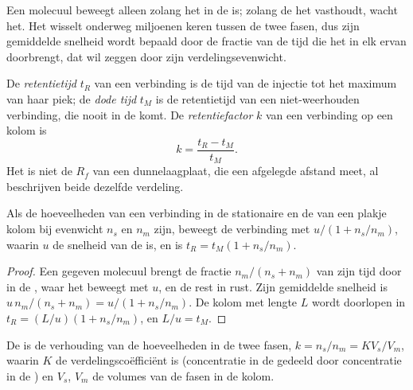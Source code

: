 Een molecuul beweegt alleen zolang het in de  is; zolang de  het vasthoudt,
wacht het. Het wisselt onderweg miljoenen keren tussen de twee fasen, dus zijn gemiddelde snelheid wordt bepaald door
de fractie van de tijd die het in elk ervan doorbrengt, dat wil zeggen door zijn verdelingsevenwicht.

\begin{definition}[Retentie]\label{def:b2:chromatography:retention}
De \emph{retentietijd} $t_R$ van een verbinding is de tijd van de injectie tot het
maximum van haar piek; de \emph{dode tijd} $t_M$ is de retentietijd van een
niet-weerhouden verbinding, die nooit in de  komt. De \emph{retentiefactor}
$k$ van een verbinding op een kolom is
\begin{equation*}
k = \frac{t_R - t_M}{t_M}.
\end{equation*}
Het is niet de $R_f$ van een dunnelaagplaat, die een afgelegde afstand meet, al beschrijven beide
dezelfde verdeling.
\end{definition}

\begin{proposition}[Retentietijd]\label{prop:b2:chromatography:retention-time}
Als de hoeveelheden van een verbinding in de stationaire en de  van een plakje kolom bij evenwicht
$n_s$ en $n_m$ zijn, beweegt de verbinding met $u/(1 + n_s/n_m)$, waarin $u$ de snelheid van de  is,
en is $t_R = t_M(1 + n_s/n_m)$.
\end{proposition}

\begin{proof}
Een gegeven molecuul brengt de fractie $n_m/(n_s + n_m)$ van zijn tijd door in de , waar het beweegt met
$u$, en de rest in rust. Zijn gemiddelde snelheid is $u\,n_m/(n_s + n_m) = u/(1 + n_s/n_m)$. De kolom met
lengte $L$ wordt doorlopen in $t_R = (L/u)(1 + n_s/n_m)$, en $L/u = t_M$.
\end{proof}

\begin{proposition}\label{prop:b2:chromatography:k-and-K}
De  is de verhouding van de hoeveelheden in de twee fasen, $k = n_s/n_m = KV_s/V_m$, waarin $K$
de verdelingscoëfficiënt is (concentratie in de  gedeeld door concentratie in de ) en $V_s$, $V_m$ de volumes van de fasen in de kolom.
\end{proposition}

